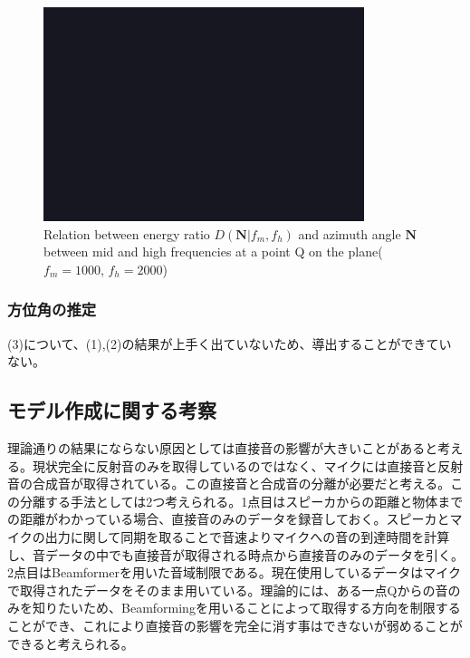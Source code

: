 \begin{figure}[t]
  \begin{center}
  \vspace{1zh}
    \includegraphics[width=0.7\linewidth]{images/fig_sample.png}   
  \end{center}
  \caption{Relation between energy ratio $D(\mathbf{N}|f_m, f_h)$ and azimuth angle $\mathbf{N}$ between mid and high frequencies at a point Q on the plane($f_m = 1000$, $f_h = 2000$)}
  \label{fig:result2}
\end{figure}

\subsubsection{方位角の推定}
(3)について、(1),(2)の結果が上手く出ていないため、導出することができていない。


\subsection{モデル作成に関する考察}
 理論通りの結果にならない原因としては直接音の影響が大きいことがあると考える。現状完全に反射音のみを取得しているのではなく、マイクには直接音と反射音の合成音が取得されている。この直接音と合成音の分離が必要だと考える。この分離する手法としては2つ考えられる。1点目はスピーカからの距離と物体までの距離がわかっている場合、直接音のみのデータを録音しておく。スピーカとマイクの出力に関して同期を取ることで音速よりマイクへの音の到達時間を計算し、音データの中でも直接音が取得される時点から直接音のみのデータを引く。2点目はBeamformerを用いた音域制限である。現在使用しているデータはマイクで取得されたデータをそのまま用いている。理論的には、ある一点Qからの音のみを知りたいため、Beamformingを用いることによって取得する方向を制限することができ、これにより直接音の影響を完全に消す事はできないが弱めることができると考えられる。

